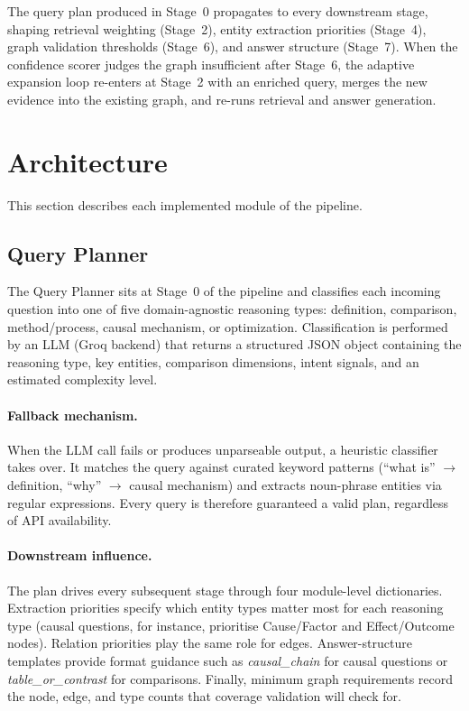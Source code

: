 \documentclass[11pt,a4paper]{article}
\begin{document}
The query plan produced in Stage~0 propagates to every downstream stage,
shaping retrieval weighting (Stage~2), entity extraction priorities
(Stage~4), graph validation thresholds (Stage~6), and answer structure
(Stage~7). When the confidence scorer judges the graph insufficient after
Stage~6, the adaptive expansion loop re-enters at Stage~2 with an enriched
query, merges the new evidence into the existing graph, and re-runs retrieval
and answer generation.

\section{Architecture}

This section describes each implemented module of the pipeline.

\subsection{Query Planner}

The Query Planner sits at Stage~0 of the pipeline and classifies each
incoming question into one of five domain-agnostic reasoning types:
definition, comparison, method/process, causal mechanism, or optimization.
Classification is performed by an LLM (Groq backend) that returns a
structured JSON object containing the reasoning type, key entities,
comparison dimensions, intent signals, and an estimated complexity level.

\paragraph{Fallback mechanism.}
When the LLM call fails or produces unparseable output, a heuristic classifier
takes over. It matches the query against curated keyword patterns
(``what is'' $\rightarrow$ definition, ``why'' $\rightarrow$ causal mechanism)
and extracts noun-phrase entities via regular expressions. Every query is
therefore guaranteed a valid plan, regardless of API availability.

\paragraph{Downstream influence.}
The plan drives every subsequent stage through four module-level dictionaries.
Extraction priorities specify which entity types matter most for each
reasoning type (causal questions, for instance, prioritise Cause/Factor and
Effect/Outcome nodes). Relation priorities play the same role for edges.
Answer-structure templates provide format guidance such as
\textit{causal\_chain} for causal questions or \textit{table\_or\_contrast} for
comparisons. Finally, minimum graph requirements record the node, edge, and
type counts that coverage validation will check for.
\end{document}
